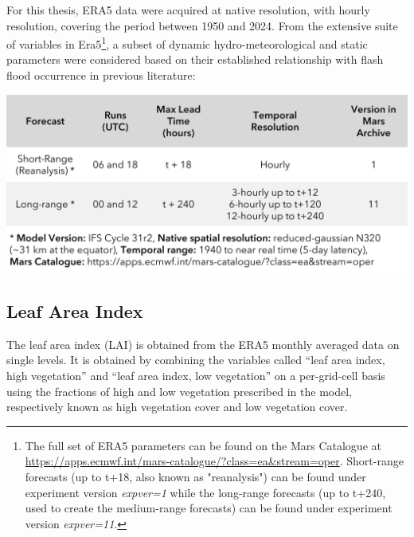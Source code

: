 For this thesis, ERA5 data were acquired at native resolution, with hourly resolution, covering the period between 1950 and 2024. From the extensive suite of variables in Era5\footnote {The full set of ERA5 parameters can be found on the Mars Catalogue at \url{https://apps.ecmwf.int/mars-catalogue/?class=ea&stream=oper}. Short-range forecasts (up to t+18, also known as "reanalysis") can be found under experiment version \textit{expver=1} while the long-range forecasts (up to t+240, used to create the medium-range forecasts) can be found under experiment version \textit{expver=11}.}, a subset of dynamic hydro-meteorological and static parameters were considered based on their established relationship with flash flood occurrence in previous literature: 

\begin{table}[htbp]
\centering
{}
\includegraphics[width=1\textwidth]{01_forecasts_types.png}
\label{table:forecasts_types}
\end{table}



\subsection{Leaf Area Index}
The leaf area index (LAI) is obtained from the ERA5 monthly averaged data on single levels. It is obtained by combining the variables called “leaf area index, high vegetation” and “leaf area index, low vegetation” on a per-grid-cell basis using the fractions of high and low vegetation prescribed in the model, respectively known as high vegetation cover and low vegetation cover.







